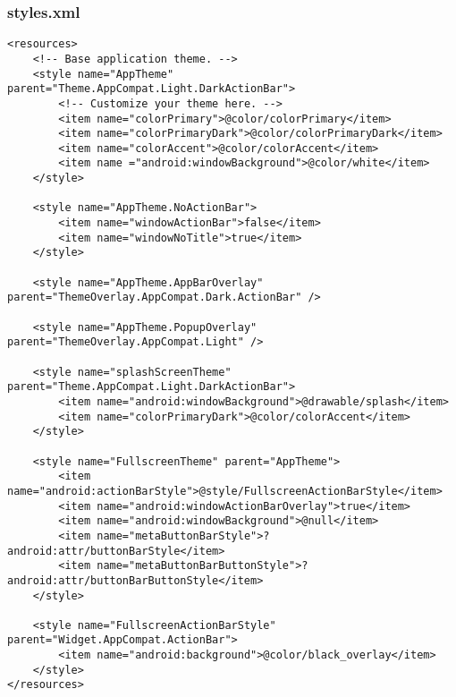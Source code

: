 \subsubsection{styles.xml}
\begin{lstlisting}
<resources>
    <!-- Base application theme. -->
    <style name="AppTheme" parent="Theme.AppCompat.Light.DarkActionBar">
        <!-- Customize your theme here. -->
        <item name="colorPrimary">@color/colorPrimary</item>
        <item name="colorPrimaryDark">@color/colorPrimaryDark</item>
        <item name="colorAccent">@color/colorAccent</item>
        <item name ="android:windowBackground">@color/white</item>
    </style>

    <style name="AppTheme.NoActionBar">
        <item name="windowActionBar">false</item>
        <item name="windowNoTitle">true</item>
    </style>

    <style name="AppTheme.AppBarOverlay" parent="ThemeOverlay.AppCompat.Dark.ActionBar" />

    <style name="AppTheme.PopupOverlay" parent="ThemeOverlay.AppCompat.Light" />

    <style name="splashScreenTheme" parent="Theme.AppCompat.Light.DarkActionBar">
        <item name="android:windowBackground">@drawable/splash</item>
        <item name="colorPrimaryDark">@color/colorAccent</item>
    </style>

    <style name="FullscreenTheme" parent="AppTheme">
        <item name="android:actionBarStyle">@style/FullscreenActionBarStyle</item>
        <item name="android:windowActionBarOverlay">true</item>
        <item name="android:windowBackground">@null</item>
        <item name="metaButtonBarStyle">?android:attr/buttonBarStyle</item>
        <item name="metaButtonBarButtonStyle">?android:attr/buttonBarButtonStyle</item>
    </style>

    <style name="FullscreenActionBarStyle" parent="Widget.AppCompat.ActionBar">
        <item name="android:background">@color/black_overlay</item>
    </style>
</resources>
\end{lstlisting}